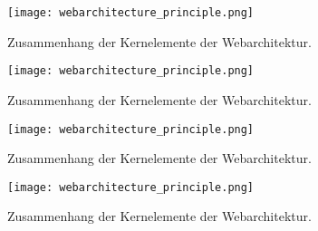 \begin{figure}[H]
	\centering
	\texttt{[image: webarchitecture\_principle.png]}
	\caption[Zusammenhang der Kernelemente der Webarchitektur]{Zusammenhang der Kernelemente der Webarchitektur.\protect\footnotemark}
\end{figure}
\begin{figure}[H]
	\centering
	\texttt{[image: webarchitecture\_principle.png]}
	\caption[Zusammenhang der Kernelemente der Webarchitektur]{Zusammenhang der Kernelemente der Webarchitektur.\protect\footnotemark}
\end{figure}
\begin{figure}[H]
	\centering
	\texttt{[image: webarchitecture\_principle.png]}
	\caption[Zusammenhang der Kernelemente der Webarchitektur]{Zusammenhang der Kernelemente der Webarchitektur.\protect\footnotemark}
\end{figure}
\begin{figure}[H]
	\centering
	\texttt{[image: webarchitecture\_principle.png]}
	\caption[Zusammenhang der Kernelemente der Webarchitektur]{Zusammenhang der Kernelemente der Webarchitektur.\protect\footnotemark}
\end{figure}

